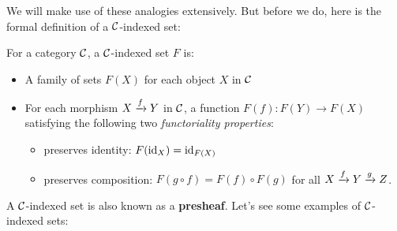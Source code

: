 We will make use of these analogies extensively. But before 
we do, here is the formal definition of a $\mathcal C$-indexed set:

\begin{definition}
  For a category $\mathcal C$,
  a $\mathcal C$-indexed set $F$ is:
  \begin{itemize}
    \item A family of sets
  $F(X)$ for each object $X$ in $\mathcal C$
    \item For each morphism $X \xrightarrow{f} Y$ in $\mathcal C$, 
    a function $F(f) : F(Y) \to F(X)$ satisfying
    the following two \emph{functoriality properties}:
    \begin{itemize}
    \item preserves identity: $F(\operatorname{id}_X) = \operatorname{id}_{F(X)}$
    \item preserves composition: $F(g \circ f) = F(f) \circ F(g)$ for all $X \xrightarrow{f} Y \xrightarrow{g} Z$.
    \end{itemize}
  \end{itemize}
\end{definition}
A $\mathcal C$-indexed set is also known as a \textbf{presheaf}.
Let's see some examples of $\mathcal C$-indexed sets:
